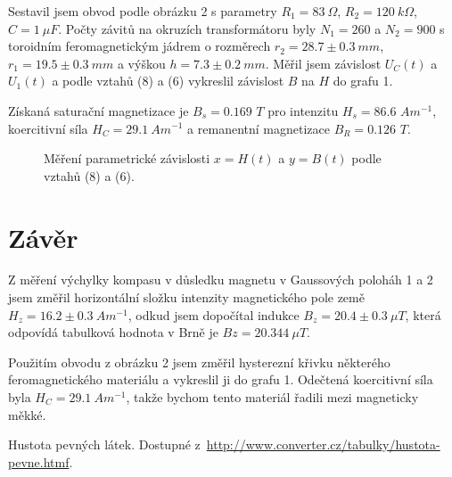 \documentclass[a4paper,11pt]{article}
\begin{document}
Sestavil jsem obvod podle obrázku 2 s parametry $ R_1 = 83\ \Omega $, $ R_2 = 120\ k\Omega $, $ C = 1\ \mu F $. Počty závitů na okruzích transformátoru byly $ N_1 = 260$ a $ N_2 = 900 $ s toroidním feromagnetickým jádrem o rozměrech $ r_2 = 28.7 \pm 0.3 \ mm $, $ r_1 = 19.5 \pm 0.3 \ mm $ a výškou $ h = 7.3 \pm 0.2 \ mm $. Měřil jsem závislost $ U_C(t) $ a $ U_1(t) $ a podle vztahů (8) a (6) vykreslil závislost $ B $ na $ H $ do grafu 1.

Získaná saturační magnetizace je $B_s = 0.169$ $ T $ pro intenzitu $H_s = 86.6$ $ Am^{-1} $, koercitivní síla $ H_C = 29.1\ Am^{-1} $ a remanentní magnetizace $ B_R = 0.126 $ $ T $.


\begin{figure}[htpb]
    \centering
    
    \captionsetup{type=graph}
    \caption{Měření parametrické závislosti $ x = H(t) $ a $ y = B(t) $ podle vztahů (8) a (6). 
}
\end{figure}

\section{Závěr}

Z měření výchylky kompasu v důsledku magnetu v Gaussových poloháh 1 a 2 jsem změřil horizontální složku intenzity magnetického pole země $ H_z = 16.2  \pm 0.3 \ Am^{-1} $, odkud jsem dopočítal indukce $ B_z = 20.4 \pm 0.3\ \mu T $, která odpovídá tabulková hodnota v Brně je $ Bz = 20.344\ \mu T $. 

Použitím obvodu z obrázku 2 jsem změřil hysterezní křivku některého feromagnetického materiálu a vykreslil ji do grafu 1. Odečtená koercitivní síla byla $ H_C = 29.1\ Am^{-1} $, takže bychom tento materiál řadili mezi magneticky měkké.

\begin{thebibliography}{0}
 Hustota pevných látek. Dostupné z~\url{http://www.converter.cz/tabulky/hustota-pevne.htmf}.   
\end{thebibliography}
\end{document}
